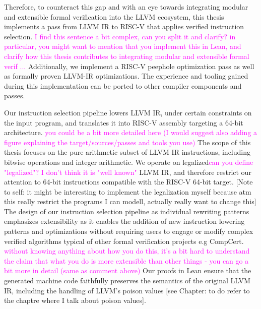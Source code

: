 Therefore, to counteract this gap and with an eye towards integrating modular and extensible formal verification 
into the LLVM ecosystem, this thesis implements a pass from LLVM IR to RISC-V that applies verified instruction selection.
\textcolor{magenta}{I find this sentence a bit complex, can you split it and clarify? in particular, 
you might want to mention that you implement this in Lean, and clarify how this thesis contributes to integrating 
modular and extensible formal verif ...} 
Additionally, we implement a RISC-V peephole optimization pass as well as formally proven LLVM-IR optimizations. 
The experience and tooling gained during this implementation can be ported to other compiler components and passes.

Our instruction selection pipeline lowers LLVM IR, under certain constraints on the input program, 
and translates it into RISC-V assembly targeting a 64-bit architecture.
\textcolor{magenta}{you could be a bit more detailed here (I would suggest also adding a figure explaining the target/sources/passes and tools you use)}
The scope of this thesis focuses on the pure arithmetic subset of LLVM IR instructions, including bitwise operations and integer arithmetic. 
We operate on legalized\textcolor{magenta}{can you define "legalized"? I don't think it is "well known"} LLVM IR, 
and therefore restrict our attention to 64-bit instructions compatible with the RISC-V 64-bit target.
[Note to self: it might be interesting to implement the legalization myself because atm this really restrict the programs I can modell, actually really want to change this]
The design of our instruction selection pipeline as individual rewriting patterns emphasizes extensibility as 
it enables the addition of new instruction lowering patterns and optimizations without requiring users to engage or 
modify complex verified algorithms typical of other formal verification projects e.g CompCert. 
\textcolor{magenta}{without knowing anything about how you do this, it's a bit hard to understand the claim that 
what you do is more extensible than other things - you can go a bit more in detail (same as comment above)}
Our proofs in Lean ensure that the generated machine code faithfully preserves the semantics of the original LLVM IR, 
including the handling of LLVM’s poison values [see Chapter: to do refer to the chaptre where I talk about poison values].

